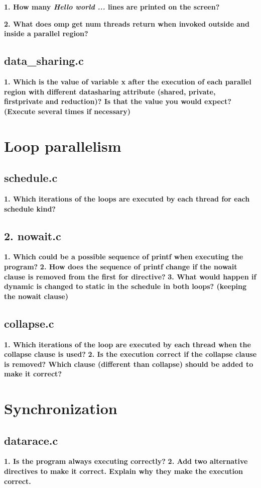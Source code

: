 \documentclass[12]{article}
\begin{document}
\textbf{1. How many \textit{Hello world ...} lines are printed on the screen?}

\textbf{2. What does omp get num threads return when invoked outside and inside a parallel region?}

\subsection{data\_sharing.c}
\textbf{1. Which is the value of variable x after the execution of each parallel region with different datasharing
attribute (shared, private, firstprivate and reduction)? Is that the value you would expect? (Execute several times if necessary)}

\section{Loop parallelism}
\subsection{schedule.c}
\textbf{1. Which iterations of the loops are executed by each thread for each schedule kind?}

\subsection{2. nowait.c}
\textbf{1. Which could be a possible sequence of printf when executing the program?}
\textbf{2. How does the sequence of printf change if the nowait clause is removed from the first for
directive?}
\textbf{3. What would happen if dynamic is changed to static in the schedule in both loops? (keeping
the nowait clause)}
\subsection{collapse.c}
\textbf{1. Which iterations of the loop are executed by each thread when the collapse clause is used?}
\textbf{2. Is the execution correct if the collapse clause is removed? Which clause (different than
collapse) should be added to make it correct?}
\section{Synchronization}
\subsection{datarace.c} 
\textbf{1. Is the program always executing correctly?}
\textbf{2. Add two alternative directives to make it correct. Explain why they make the execution
correct.}
\end{document}

